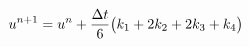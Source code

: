 \documentclass[preview]{standalone}
\begin{document}
\begin{align*}
\special{dvisvgm:raw <g id='unique000'>}u^{n+1} = u^n + \frac{\Delta t}{6}\big(k_1 + 2k_2 + 2k_3 + k_4\big)\special{dvisvgm:raw </g>}
\end{align*}
\end{document}
